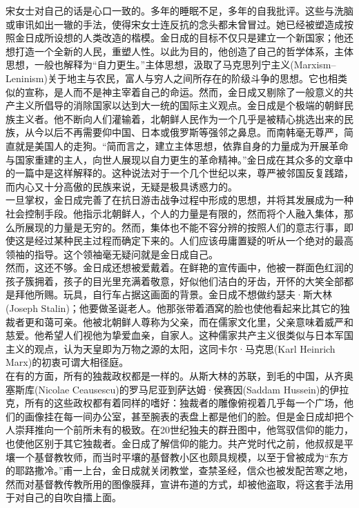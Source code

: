 \begin{multicols}{\theparacolNo}
宋女士对自己的话是心口一致的。多年的睡眠不足，多年的自我批评。这些与洗脑或审讯如出一辙的手法，使得宋女士连反抗的念头都未曾冒过。她已经被塑造成按照金日成所设想的人类改造的楷模。金日成的目标不仅只是建立一个新国家；他还想打造一个全新的人民，重塑人性。以此为目的，他创造了自己的哲学体系，主体思想，一般也解释为“自力更生。”主体思想，汲取了马克思列宁主义(Marxism–Leninism)关于地主与农民，富人与穷人之间所存在的阶级斗争的思想。它也相类似的宣称，是人而不是神主宰着自己的命运。然而，金日成又剔除了一般意义的共产主义所倡导的消除国家以达到大一统的国际主义观点。金日成是个极端的朝鲜民族主义者。他不断向人们灌输着，北朝鲜人民作为一个几乎是被精心挑选出来的民族，从今以后不再需要仰中国、日本或俄罗斯等强邻之鼻息。而南韩毫无尊严，简直就是美国人的走狗。“简而言之，建立主体思想，依靠自身的力量成为开展革命与国家重建的主人，向世人展现以自力更生的革命精神。”金日成在其众多的文章中的一篇中是这样解释的。这种说法对于一个几个世纪以来，尊严被邻国反复践踏，而内心又十分高傲的民族来说，无疑是极具诱惑力的。\\

一旦掌权，金日成完善了在抗日游击战争过程中形成的思想，并将其发展成为一种社会控制手段。他指示北朝鲜人，个人的力量是有限的，然而将个人融入集体，那么所展现的力量是无穷的。然而，集体也不能不容分辨的按照人们的意志行事，即使这是经过某种民主过程而确定下来的。人们应该毋庸置疑的听从一个绝对的最高领袖的指导。这个领袖毫无疑问就是金日成自己。\\

然而，这还不够。金日成还想被爱戴着。在鲜艳的宣传画中，他被一群面色红润的孩子簇拥着，孩子的目光里充满着敬意，好似他们洁白的牙齿，开怀的大笑全部都是拜他所赐。玩具，自行车占据这画面的背景。金日成不想做约瑟夫·斯大林(Joseph Stalin)；他要做圣诞老人。他那张带着酒窝的脸也使他看起来比其它的独裁者更和蔼可亲。他被北朝鲜人尊称为父亲，而在儒家文化里，父亲意味着威严和慈爱。他希望人们视他为挚爱血亲，自家人。这种儒家共产主义很类似与日本军国主义的观点，认为天皇即为万物之源的太阳，这同卡尔·马克思(Karl Heinrich Marx)的初衷可谓大相径庭。\\

在有的方面，所有的独裁政权都是一样的。从斯大林的苏联，到毛的中国，从齐奥塞斯库(Nicolae Ceausescu)的罗马尼亚到萨达姆·侯赛因(Saddam Hussein)的伊拉克，所有的这些政权都有着同样的嗜好：独裁者的雕像俯视着几乎每一个广场，他们的画像挂在每一间办公室，甚至腕表的表盘上都是他们的脸。但是金日成却把个人崇拜推向一个前所未有的极致。在20世纪独夫的群丑图中，他驾驭信仰的能力，也使他区别于其它独裁者。金日成了解信仰的能力。共产党时代之前，他叔叔是平壤一个基督教牧师，而当时平壤的基督教小区也颇具规模，以至于曾被成为“东方的耶路撒冷。”甫一上台，金日成就关闭教堂，查禁圣经，信众也被发配苦寒之地，然而对基督教传教所用的图像膜拜，宣讲布道的方式，却被他盗取，将这套手法用于对自己的自吹自擂上面。\\


\end{multicols}
